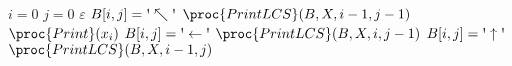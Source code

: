 \begin{codebox}
\li \If $i = 0$  $j = 0$
\li \Then \Return $\varepsilon$
	\End
\li \If $B[i,j] = \textnormal{\textquotesingle}\nwarrow\textnormal{\textquotesingle}$
\li	\Then
		 $\proc{PrintLCS}(B,X,i-1,j-1)$
\li      $\proc{Print}(x_i)$
\li \ElseIf $B[i,j] = \textnormal{\textquotesingle}\leftarrow\textnormal{\textquotesingle}$
\li \Then $\proc{PrintLCS}(B,X,i,j-1)$
\li \ElseNoIf \Comment $B[i,j] = \textnormal{\textquotesingle}\uparrow\textnormal{\textquotesingle}$
\li 	$\proc{PrintLCS}(B,X,i-1,j)$
	\End
\end{codebox}